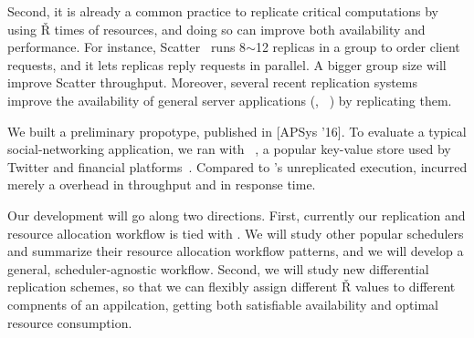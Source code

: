 Second, it is already a common practice to replicate critical computations by 
using \v{R} times of resources, and doing so can improve both availability and 
performance. For instance, Scatter~\cite{scatter:sosp11} runs 8$\sim$12 
replicas in a \paxos group to order client requests, and it lets replicas reply 
requests in parallel. A bigger group size will improve Scatter throughput. 
Moreover, several recent replication 
systems~\cite{eve:osdi12,rex:eurosys14,crane:sosp15} 
improve the availability of general server applications (\eg, 
\mysql~\cite{mysql}) by replicating them.




 We built a preliminary \tripod propotype, 
published in [APSys '16]. To evaluate a typical social-networking application, 
we ran \tripod with \memcached~\cite{memcached}, a popular key-value store used 
by Twitter and financial platforms~\cite{financial}. Compared to \memcached's 
unreplicated execution, \tripod incurred merely a \tputoverhead overhead in 
throughput and \latencyoverhead in response time.


 Our \tripod development will go along two directions. 
First, currently our replication and resource allocation workflow is tied with 
\mesos. We will study other popular schedulers and summarize their 
resource allocation workflow patterns, and we will develop a general, 
scheduler-agnostic workflow. Second, we will study new differential replication 
schemes, so that we can flexibly assign different \v{R} values to different 
compnents of an appilcation, getting both satisfiable availability and optimal 
resource consumption.

